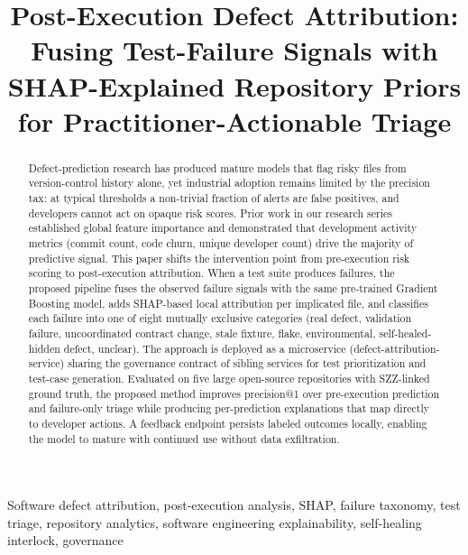 \documentclass[conference]{IEEEtran}
\begin{document}
\title{Post-Execution Defect Attribution: Fusing Test-Failure Signals with SHAP-Explained Repository Priors for Practitioner-Actionable Triage}

\author{
}

\maketitle

\begin{abstract}
Defect-prediction research has produced mature models that flag risky files from version-control history alone, yet industrial adoption remains limited by the precision tax: at typical thresholds a non-trivial fraction of alerts are false positives, and developers cannot act on opaque risk scores. Prior work in our research series established global feature importance and demonstrated that development activity metrics (commit count, code churn, unique developer count) drive the majority of predictive signal. This paper shifts the intervention point from pre-execution risk scoring to post-execution attribution. When a test suite produces failures, the proposed pipeline fuses the observed failure signals with the same pre-trained Gradient Boosting model, adds SHAP-based local attribution per implicated file, and classifies each failure into one of eight mutually exclusive categories (real defect, validation failure, uncoordinated contract change, stale fixture, flake, environmental, self-healed-hidden defect, unclear). The approach is deployed as a microservice (defect-attribution-service) sharing the governance contract of sibling services for test prioritization and test-case generation. Evaluated on five large open-source repositories with SZZ-linked ground truth, the proposed method improves precision@1 over pre-execution prediction and failure-only triage while producing per-prediction explanations that map directly to developer actions. A feedback endpoint persists labeled outcomes locally, enabling the model to mature with continued use without data exfiltration.
\end{abstract}

\begin{IEEEkeywords}
Software defect attribution, post-execution analysis, SHAP, failure taxonomy, test triage, repository analytics, software engineering explainability, self-healing interlock, governance
\end{IEEEkeywords}
\end{document}
